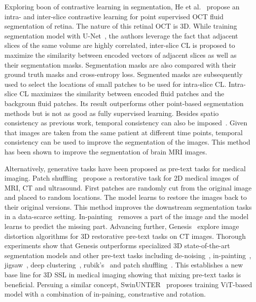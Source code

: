 \documentclass[a4paper,11pt,oneside]{report}
\begin{document}
Exploring boon of contrastive learning in segmentation, He et al.~\cite{He2022Intra} propose an intra- and inter-slice contrastive learning for point supervised OCT fluid segmentation of retina. The nature of this retinal OCT is 3D. While training segmentation model with U-Net~\cite{Ronneberger2015}, the authors leverage the fact that adjacent slices of the same volume are highly correlated, inter-slice CL is proposed to maximize the similarity between encoded vectors of adjacent slices as well as their segmentation masks. Segmentation masks are also compared with their ground truth masks and cross-entropy loss. Segmented masks are subsequently used to select the locations of small patches to be used for intra-slice CL. Intra-slice CL maximizes the similarity between encoded fluid patches and the backgroun fluid patches. Its result outperforms other point-based segmentation methods but is not as good as fully supervised learning. Besides spatio consistency as previous work, temporal consistency can also be imposed~\cite{Ren2022}. Given that images are taken from the same patient at different time points, temporal consistency can be used to improve the segmentation of the images. This method has been shown to improve the segmentation of brain MRI images.

Alternatively, generative tasks have been proposed as pre-text tasks for medical imaging. Patch shuffling~\cite{Chen2019} propose a restorative task for 2D medical images of MRI, CT and ultrasound. First patches are randomly cut from the original image and placed to random locations. The model learns to restore the images back to their original versions. This method improves the downstream segmentation tasks in a data-scarce setting. In-painting~\cite{Pathak2016} removes a part of the image and the model learns to predict the missing part. Advancing further, Genesis~\cite{Zhou2021} explore image distortion algorithms for 3D restorative pre-text tasks on CT images. Thorough experiments show that Genesis outperforms specialized 3D state-of-the-art segmentation models and other pre-text tasks including de-noising~\cite{Vincent2010}, in-painting~\cite{Pathak2016}, jigsaw~\cite{Noroozi2016}, deep clustering~\cite{Caron2018}, rubik's~\cite{Zhuang2019} and patch shuffling~\cite{Chen2019}. This establishes a new base line for 3D SSL in medical imaging showing that mixing pre-text tasks is beneficial. Persuing a similar concept, SwinUNTER~\cite{Tang2022} proposes training ViT-based model with a combination of in-paining, constrastive and rotation.
\end{document}
